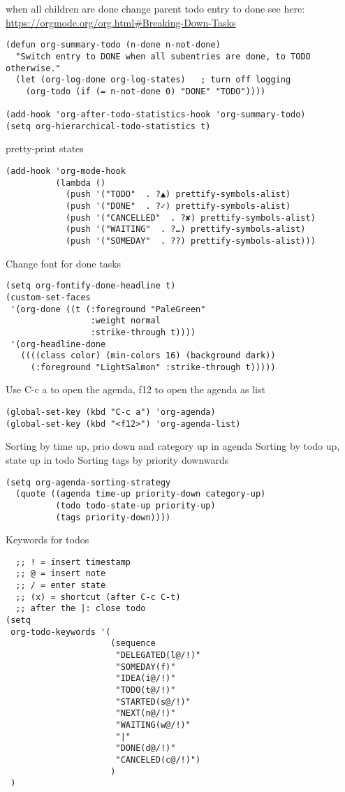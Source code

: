 \documentclass[11pt]{article}
\begin{document}
when all children are done change parent todo entry to done
 see here: \url{https://orgmode.org/org.html\#Breaking-Down-Tasks}
\begin{verbatim}
(defun org-summary-todo (n-done n-not-done)
  "Switch entry to DONE when all subentries are done, to TODO otherwise."
  (let (org-log-done org-log-states)   ; turn off logging
    (org-todo (if (= n-not-done 0) "DONE" "TODO"))))

(add-hook 'org-after-todo-statistics-hook 'org-summary-todo)
(setq org-hierarchical-todo-statistics t)
\end{verbatim}
pretty-print states
\begin{verbatim}
(add-hook 'org-mode-hook
          (lambda ()
            (push '("TODO"  . ?▲) prettify-symbols-alist)
            (push '("DONE"  . ?✓) prettify-symbols-alist)
            (push '("CANCELLED"  . ?✘) prettify-symbols-alist)
            (push '("WAITING"  . ?…) prettify-symbols-alist)
            (push '("SOMEDAY"  . ??) prettify-symbols-alist)))
\end{verbatim}
Change font for done tasks
\begin{verbatim}
(setq org-fontify-done-headline t)
(custom-set-faces
 '(org-done ((t (:foreground "PaleGreen"
                 :weight normal
                 :strike-through t))))
 '(org-headline-done
   ((((class color) (min-colors 16) (background dark))
     (:foreground "LightSalmon" :strike-through t)))))
\end{verbatim}
Use C-c a to open the agenda, f12 to open the agenda as list
\begin{verbatim}
(global-set-key (kbd "C-c a") 'org-agenda)
(global-set-key (kbd "<f12>") 'org-agenda-list)
\end{verbatim}
Sorting by time up, prio down and category up in agenda
Sorting by todo up, state up in todo
Sorting tags by priority downwards
\begin{verbatim}
(setq org-agenda-sorting-strategy
  (quote ((agenda time-up priority-down category-up)
          (todo todo-state-up priority-up)
          (tags priority-down))))
\end{verbatim}
Keywords for todos
\begin{verbatim}
  ;; ! = insert timestamp
  ;; @ = insert note
  ;; / = enter state
  ;; (x) = shortcut (after C-c C-t)
  ;; after the |: close todo
(setq
 org-todo-keywords '(
                     (sequence
                      "DELEGATED(l@/!)"
                      "SOMEDAY(f)"
                      "IDEA(i@/!)"
                      "TODO(t@/!)"
                      "STARTED(s@/!)"
                      "NEXT(n@/!)"
                      "WAITING(w@/!)"
                      "|"
                      "DONE(d@/!)"
                      "CANCELED(c@/!)")
                     )
 )
\end{verbatim}
\end{document}
